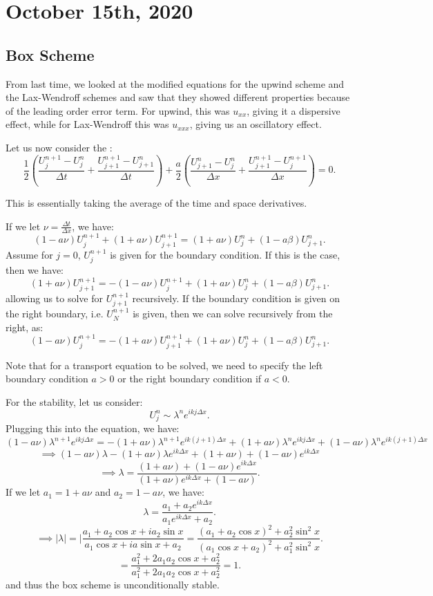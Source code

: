 \documentclass[../main/main.tex]{subfiles}
\begin{document}
\section{October 15th, 2020}
\subsection{Box Scheme}
From last time, we looked at the modified equations for the upwind scheme and the Lax-Wendroff schemes and saw that they showed different properties because of the leading order error term. For upwind, this was $u_{x x}$, giving it a dispersive effect, while for Lax-Wendroff this was $u_{x x x}$, giving us an oscillatory effect.

Let us now consider the : \[
    \frac{1}{2}\left( \frac{U_j^{n+1}-U_j^{n}}{\Delta t} + \frac{U_{j+1}^{n+1} - U_{j+1}^{n}}{\Delta t} \right)  + \frac{a}{2} \left( \frac{U_{j+1}^{n}-U_j^n}{\Delta x} + \frac{U_{j+1}^{n+1}- U_j^{n+1}}{\Delta x} \right)  = 0
.\] 
\begin{remark}
    This is essentially taking the average of the time and space derivatives.
\end{remark}
If we let $\nu = \frac{\Delta t }{\Delta x}$, we have: \[
    (1-a\nu) U_j^{n+1} + (1+a\nu) U_{j+1}^{n+1} = (1+a\nu)U_{j}^{n} + (1-a\beta)U_{j+1}^{n}
.\] Assume for $j=0$,  $U_j^{n+1}$ is given for the boundary condition. If this is the case, then we have: \[
(1+a\nu) U_{j+1}^{n+1} = -(1-a\nu)U_j^{n+1} + (1+a\nu)U_{j}^{n} + (1-a\beta)U_{j+1}^{n} 
.\] allowing us to solve for $U_{j+1}^{n+1}$ recursively. If the boundary condition is given on the right boundary, i.e. $U_N^{n+1}$ is given, then we can solve recursively from the right, as: \[ 
 (1-a\nu)U_j^{n+1} =-(1+a\nu) U_{j+1}^{n+1} + (1+a\nu)U_{j}^{n} + (1-a\beta)U_{j+1}^{n} 
.\] 
\begin{remark}
Note that for a transport equation to be solved, we need to specify the left boundary condition $a>0$ or the right boundary condition if  $a < 0.$ 
\end{remark}
For the stability, let us consider: \[
    U_j^n \sim \lambda^{n} e^{ikj\Delta x}
.\] Plugging this into the equation, we have: \[
(1-a\nu) \lambda^{n+1} e^{ikj\Delta x} = -(1+a\nu) \lambda^{n+1} e^{ik(j+1)\Delta x} + (1+a\nu) \lambda^{n} e^{ikj\Delta x} + (1-a\nu) \lambda^{n} e^{ik(j+1)\Delta x}
\] \[
\implies (1-a\nu)\lambda -(1+a\nu)\lambda e^{ik\Delta x} + (1+a\nu) + (1-a\nu) e^{ik\Delta x}
\]\[
\implies \lambda = \frac{(1+a\nu) + (1-a\nu) e^{ik\Delta x}}{(1+a\nu)e^{ik\Delta x} + (1-a\nu)}
.\] If we let $ a_1 = 1+a\nu$ and $ a_2 = 1-a\nu$, we have: \[
\lambda = \frac{a_1 + a_2 e^{ik\Delta x}}{a_1 e^{ik\Delta x} + a_2}
.\]\[
\implies |\lambda| = |\frac{a_1+a_2\cos x + i a_2 \sin x }{a_1 \cos x + ia\sin x + a_2} = \frac{(a_1+a_2\cos x)^2+a_2^2\sin^2 x}{(a_1\cos x + a_2)^2 + a_1^2\sin^2 x} 
.\] \[
= \frac{a_1^2+2a_1a_2\cos x + a_2^2}{a_1^2 + 2a_1a_2\cos x + a_2^2} = 1
.\]  and thus the box scheme is unconditionally stable.
\end{document}
